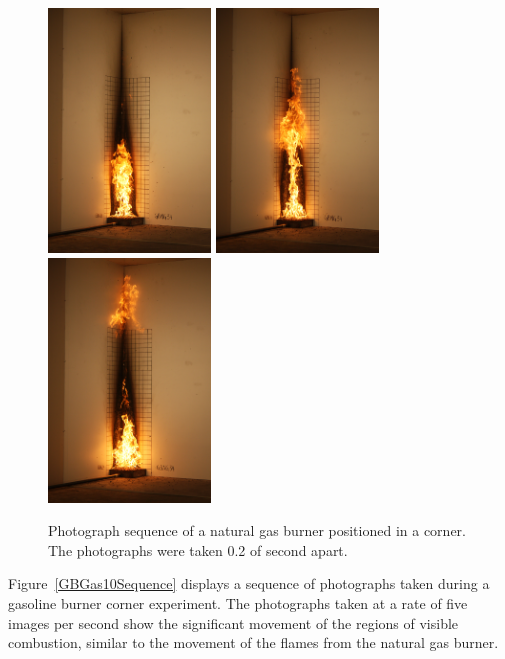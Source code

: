 \documentclass[twoside]{uocthesis}
\begin{document}
{\begin{figure}[p]
	\includegraphics[width=1.7in]{../Figures/GBNG34_SequenceIMG_0996}
	\includegraphics[width=1.7in]{../Figures/GBNG34_SequenceIMG_0997}
	\includegraphics[width=1.7in]{../Figures/GBNG34_SequenceIMG_0998} \\
	

	\caption[Photograph sequence of a natural gas burner positioned in a corner.]{Photograph sequence of a natural gas burner positioned in a corner. The photographs were taken 0.2 of second apart.}
	\label{GBNG34Sequence}
\end{figure}

Figure~\ref{GBGas10Sequence} displays a sequence of photographs taken during a gasoline burner corner experiment.  The photographs taken at a rate of five images per second show the significant movement of the regions of visible combustion, similar to the movement of the flames from the natural gas burner.

}
\end{document}
